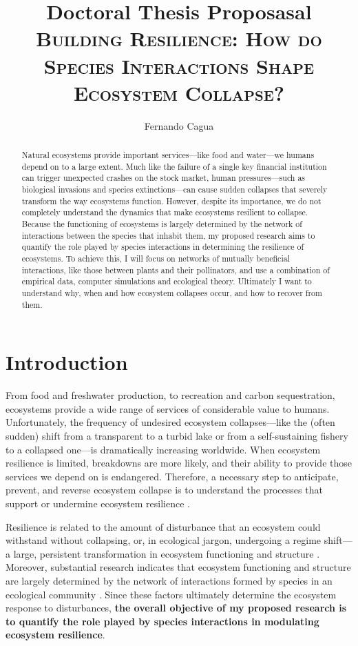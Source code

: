 \documentclass[a4paper]{article}
\title{
	{\normalsize Doctoral Thesis Proposasal} \\
	{\LARGE \textsc{Building Resilience: How do Species Interactions Shape Ecosystem Collapse?}}
}
\author{
  {\large Fernando Cagua}
}
\date{}
\begin{document}
\maketitle

\begin{abstract}
  Natural ecosystems provide important services---like food and water---we humans depend on to a large extent.
  Much like the failure of a single key financial institution can trigger unexpected crashes on the stock market, human pressures---such as biological invasions and species extinctions---can cause sudden collapses that severely transform the way ecosystems function.
  However, despite its importance, we do not completely understand the dynamics that make ecosystems resilient to collapse.
  Because the functioning of ecosystems is largely determined by the network of interactions between the species that inhabit them, my proposed research aims to quantify the role played by species interactions in determining the resilience of ecosystems.
  To achieve this, I will focus on networks of mutually beneficial interactions, like those between plants and their pollinators, and use a combination of empirical data, computer simulations and ecological theory.
  Ultimately I want to understand why, when and how ecosystem collapses occur, and how to recover from them.
\end{abstract}




\section*{Introduction}

From food and freshwater production, to recreation and carbon sequestration, ecosystems provide a wide range of services of considerable value to humans.
Unfortunately, the frequency of undesired ecosystem collapses---like the (often sudden) shift from a transparent to a turbid lake or from a self-sustaining fishery to a collapsed one---is dramatically increasing worldwide\cite{Scheffer2001a}.
When ecosystem resilience is limited, breakdowns are more likely, and their ability to provide those services we depend on is endangered.
Therefore, a necessary step to anticipate, prevent, and reverse ecosystem collapse is to understand the processes that support or undermine ecosystem resilience \cite{Hughes2005, Tylianakis2008}.

Resilience is related to the amount of disturbance that an ecosystem could withstand without collapsing, or, in ecological jargon, undergoing a regime shift---a large, persistent transformation in ecosystem functioning and structure \cite{Holling1973, Gunderson2000}.
Moreover, substantial research indicates that ecosystem functioning and structure are largely determined by the network of interactions formed by species in an ecological community \cite{Bascompte2006, Dobson2006, Tylianakis2008, Reiss2009}.
Since these factors ultimately determine the ecosystem response to disturbances, \textbf{the overall objective of my proposed research is to quantify the role played by species interactions in modulating ecosystem resilience}.
\end{document}
